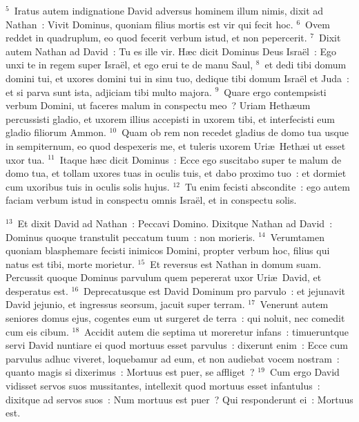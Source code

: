 ${}^{5}$~Iratus autem indignatione David adversus hominem illum nimis, dixit ad Nathan~: Vivit Dominus, quoniam filius mortis est vir qui fecit hoc.
${}^{6}$~Ovem reddet in quadruplum, eo quod fecerit verbum istud, et non pepercerit.
${}^{7}$~Dixit autem Nathan ad David~: Tu es ille vir. H\ae c dicit Dominus Deus Isra\"el~: Ego unxi te in regem super Isra\"el, et ego erui te de manu Saul,
${}^{8}$~et dedi tibi domum domini tui, et uxores domini tui in sinu tuo, dedique tibi domum Isra\"el et Juda~: et si parva sunt ista, adjiciam tibi multo majora.
${}^{9}$~Quare ergo contempsisti verbum Domini, ut faceres malum in conspectu meo~? Uriam Heth\ae um percussisti gladio, et uxorem illius accepisti in uxorem tibi, et interfecisti eum gladio filiorum Ammon.
${}^{10}$~Quam ob rem non recedet gladius de domo tua usque in sempiternum, eo quod despexeris me, et tuleris uxorem Uri\ae\ Heth\ae i ut esset uxor tua.
${}^{11}$~Itaque h\ae c dicit Dominus~: Ecce ego suscitabo super te malum de domo tua, et tollam uxores tuas in oculis tuis, et dabo proximo tuo~: et dormiet cum uxoribus tuis in oculis solis hujus.
${}^{12}$~Tu enim fecisti abscondite~: ego autem faciam verbum istud in conspectu omnis Isra\"el, et in conspectu solis.


${}^{13}$~Et dixit David ad Nathan~: Peccavi Domino. Dixitque Nathan ad David~: Dominus quoque transtulit peccatum tuum~: non morieris.
${}^{14}$~Verumtamen quoniam blasphemare fecisti inimicos Domini, propter verbum hoc, filius qui natus est tibi, morte morietur.
${}^{15}$~Et reversus est Nathan in domum suam. Percussit quoque Dominus parvulum quem pepererat uxor Uri\ae\ David, et desperatus est.
${}^{16}$~Deprecatusque est David Dominum pro parvulo~: et jejunavit David jejunio, et ingressus seorsum, jacuit super terram.
${}^{17}$~Venerunt autem seniores domus ejus, cogentes eum ut surgeret de terra~: qui noluit, nec comedit cum eis cibum.
${}^{18}$~Accidit autem die septima ut moreretur infans~: timueruntque servi David nuntiare ei quod mortuus esset parvulus~: dixerunt enim~: Ecce cum parvulus adhuc viveret, loquebamur ad eum, et non audiebat vocem nostram~: quanto magis si dixerimus~: Mortuus est puer, se affliget~?
${}^{19}$~Cum ergo David vidisset servos suos mussitantes, intellexit quod mortuus esset infantulus~: dixitque ad servos suos~: Num mortuus est puer~? Qui responderunt ei~: Mortuus est.


